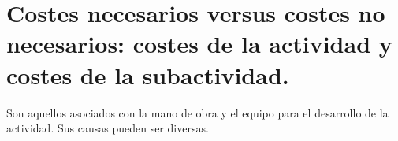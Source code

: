 \documentclass[12pt]{report} %
\begin{document}
\hypertarget{costes-necesarios-versus-costes-no-necesarios-costes-de-la-actividad-y-costes-de-la-subactividad.}{%
\section{Costes necesarios versus costes no necesarios: costes de la
actividad y costes de la
subactividad.}\label{costes-necesarios-versus-costes-no-necesarios-costes-de-la-actividad-y-costes-de-la-subactividad.}}

Son aquellos asociados con la mano de obra y el equipo para el
desarrollo de la actividad. Sus causas pueden ser diversas.


\end{document}
